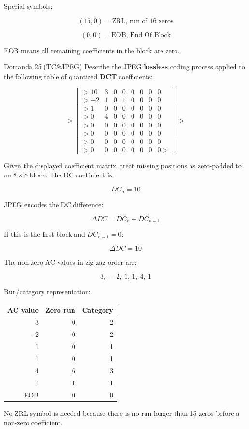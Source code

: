 Special symbols:


$$
(15,0) = \text{ZRL, run of 16 zeros}
$$



$$
(0,0) = \text{EOB, End Of Block}
$$


EOB means all remaining coefficients in the block are zero.



\begin{questionbox}{Domanda 25}
(TC\&JPEG) Describe the JPEG \textbf{lossless} coding process applied to the following table of quantized \textbf{DCT} coefficients:
\end{questionbox}

$$
> \begin{bmatrix}
> 10 & 3 & 0 & 0 & 0 & 0 & 0 & 0 \\
> -2 & 1 & 0 & 1 & 0 & 0 & 0 & 0 \\
> 1 & 0 & 0 & 0 & 0 & 0 & 0 & 0 \\
> 0 & 4 & 0 & 0 & 0 & 0 & 0 & 0 \\
> 0 & 0 & 0 & 0 & 0 & 0 & 0 & 0 \\
> 0 & 0 & 0 & 0 & 0 & 0 & 0 & 0 \\
> 0 & 0 & 0 & 0 & 0 & 0 & 0 & 0 \\
> 0 & 0 & 0 & 0 & 0 & 0 & 0 & 0
> \end{bmatrix}
> $$


Given the displayed coefficient matrix, treat missing positions as zero-padded to an $8\times 8$ block. The DC coefficient is:


$$
DC_n=10
$$


JPEG encodes the DC difference:


$$
\Delta DC = DC_n-DC_{n-1}
$$


If this is the first block and $DC_{n-1}=0$:


$$
\Delta DC=10
$$


The non-zero AC values in zig-zag order are:


$$
3,\ -2,\ 1,\ 1,\ 4,\ 1
$$


Run/category representation:


\begin{center}
\begin{tabular}{ | r | r | r | }
\hline
\textbf{AC value} & \textbf{Zero run} & \textbf{Category} \\
\hline
3 & 0 & 2 \\
\hline
-2 & 0 & 2 \\
\hline
1 & 0 & 1 \\
\hline
1 & 0 & 1 \\
\hline
4 & 6 & 3 \\
\hline
1 & 1 & 1 \\
\hline
EOB & 0 & 0 \\
\hline
\end{tabular}
\end{center}
No ZRL symbol is needed because there is no run longer than 15 zeros before a non-zero coefficient.



